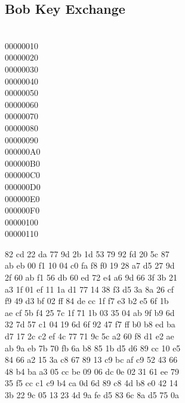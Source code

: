 {\subsection{Bob Key Exchange}
\pdumphdr
\begin{minipage}[t]{0.1\linewidth}%
\color{Violet}  \\
00000010  \\
00000020  \\
00000030  \\
00000040  \\
00000050  \\
00000060  \\
00000070  \\
00000080  \\
00000090  \\
000000A0  \\
000000B0  \\
000000C0  \\
000000D0  \\
000000E0  \\
000000F0  \\
\color{PineGreen}
00000100  \\
00000110  \\
\end{minipage}
\begin{minipage}[t]{0.6\linewidth}%
%
\color{Violet} 82 cd 22 da 77 9d 2b  1d 53 79 92 fd 20 5c 87   \\
ab eb 00 f1 10 04 c0 fa  f8 f0 19 28 a7 d5 27 9d   \\
2f 60 ab f1 56 db 60 ed  72 e4 a6 9d 66 3f 3b 21   \\
a3 1f 01 ef 11 1a d1 77  14 38 f3 d5 3a 8a 26 cf   \\
f9 49 d3 bf 02 ff 84 de  cc 1f f7 e3 b2 e5 6f 1b   \\
ae cf 5b f4 25 7c 1f 71  1b 03 35 04 ab 9f b9 6d   \\
32 7d 57 c1 04 19 6d 6f  92 47 f7 ff b0 b8 ed ba   \\
d7 17 2c c2 ef 4c 77 71  9c 5c a2 60 f8 d1 e2 ae   \\
ab 9a eb 7b 70 fb 6a b8  85 1b d5 d6 89 cc 10 e5   \\
84 66 a2 15 3a c8 67 89  13 c9 bc af c9 52 43 66   \\
48 b4 ba a3 05 cc be 09  06 dc 0e 02 31 61 ee 79   \\
35 f5 cc c1 c9 b4 ca 0d  6d 89 c8 4d b8 e0 42 14   \\
3b 22 9c 05 13 23 4d 9a  fe d5 83 6c 8a d5 75 0a   \\

\end{minipage}}
